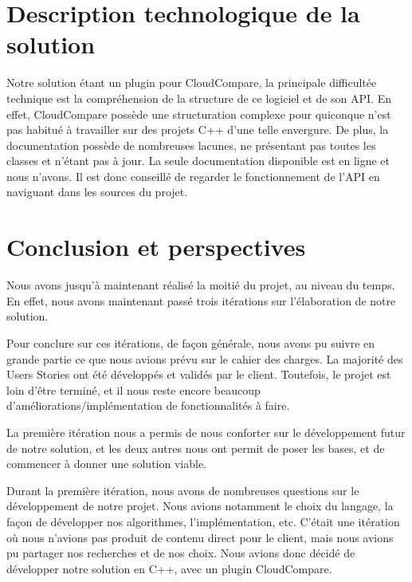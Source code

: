\documentclass[12pt,titlepage,french]{article}
\begin{document}
\section{Description technologique de la solution}
Notre solution étant un plugin pour CloudCompare, la principale difficultée technique est la compréhension de la structure de ce logiciel et de son API.
En effet, CloudCompare possède une structuration complexe pour quiconque n'est pas habitué à travailler sur des projets C++ d'une telle envergure.
De plus, la documentation possède de nombreuses lacunes, ne présentant pas toutes les classes et n'étant pas à jour. La seule documentation disponible est en ligne et nous n'avons.
Il est donc conseillé de regarder le fonctionnement de l'API en naviguant dans les sources du projet.

\newpage
\section{Conclusion et perspectives}

Nous avons jusqu'à maintenant réalisé la moitié du projet, au niveau du temps. En effet, nous avons maintenant passé trois itérations sur l'élaboration de notre solution. \newline

Pour conclure sur ces itérations, de façon générale, nous avons pu suivre en grande partie ce que nous avions prévu sur le cahier des charges. La majorité des Users Stories ont été développés et validés par le client. Toutefois, le projet est loin d'être terminé, et il nous reste encore beaucoup d'améliorations/implémentation de fonctionnalités à faire.

La première itération nous a permis de nous conforter sur le développement futur de notre solution, et les deux autres nous ont permit de poser les bases, et de commencer à donner une solution viable.

Durant la première itération, nous avons de nombreuses questions sur le développement de notre projet. Nous avions notamment le choix du langage, la façon de développer nos algorithmes, l'implémentation, etc. C'était une itération où nous n'avions pas produit de contenu direct pour le client, mais nous avions pu partager nos recherches et de nos choix. Nous avions donc décidé de développer notre solution en C++, avec un plugin CloudCompare. 
\end{document}
